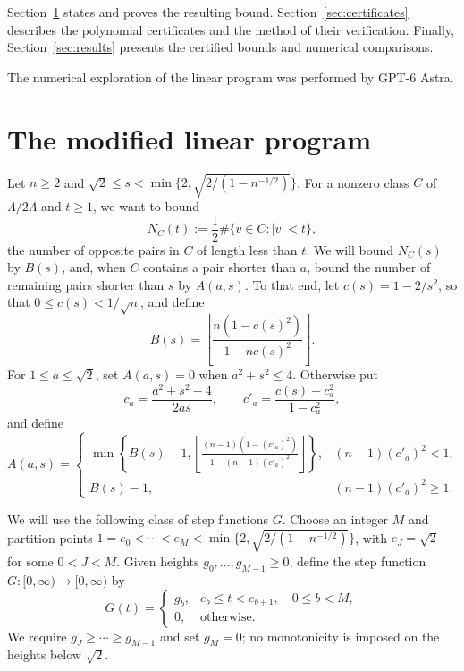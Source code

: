 \documentclass[11pt]{article}
\begin{document}
Section~\ref{sec:class-bound} states and proves the resulting bound.
Section~\ref{sec:certificates} describes the polynomial certificates
and the method of their verification. Finally, Section~\ref{sec:results}
presents the certified bounds and numerical comparisons.

The numerical exploration of the linear program was performed by GPT-$6$ Astra.

\section{The modified linear program}\label{sec:class-bound}



Let $n\ge2$ and $\sqrt2\le s<\min\{2,\sqrt{2/(1-n^{-1/2})}\}$.
For a nonzero class $C$ of $\Lambda/2\Lambda$ and $t\ge1$, we want to bound
\[
 N_C(t):=\frac12\#\{v\in C:|v|<t\},
\]
the number of opposite pairs in $C$ of length less than $t$.
We will bound $N_C(s)$ by $B(s)$, and, when $C$ contains a pair shorter
than $a$, bound the number of remaining pairs shorter than $s$ by $A(a,s)$.
To that end, let $c(s)=1-2/s^2$, so that $0\le c(s)<1/\sqrt n$, and define
\begin{equation}\label{eq:B}
 B(s)=\left\lfloor\frac{n(1-c(s)^2)}{1-nc(s)^2}\right\rfloor.
\end{equation}
For $1\le a\le\sqrt2$, set $A(a,s)=0$
when $a^2+s^2\le4$. Otherwise put
\[
 c_a=\frac{a^2+s^2-4}{2as},\qquad
 c'_a=\frac{c(s)+c_a^2}{1-c_a^2},
\]
and define
\begin{equation}\label{eq:A}
 A(a,s)=\begin{cases}
 \displaystyle\min\left\{B(s)-1,
 \left\lfloor\frac{(n-1)(1-(c'_a)^2)}{1-(n-1)(c'_a)^2}\right\rfloor\right\},
 &(n-1)(c'_a)^2<1,\\
 B(s)-1,&(n-1)(c'_a)^2\ge1.
 \end{cases}
\end{equation}

We will use the following class of step functions $G$. Choose an integer $M$ and partition points
$1=e_0<\cdots<e_M<\min\{2,\sqrt{2/(1-n^{-1/2})}\}$, with $e_J=\sqrt2$ for some $0<J<M$. Given heights $g_0,\ldots,g_{M-1}\ge0$, define
the step function $G:[0,\infty)\to[0,\infty)$ by
\begin{equation}\label{eq:weight}
 G(t)=\begin{cases}
 g_b,&e_b\le t<e_{b+1},\quad 0\le b<M,\\
 0,&\text{otherwise}.
 \end{cases}
\end{equation}
We require $g_J\ge\cdots\ge g_{M-1}$ and set $g_M=0$; no monotonicity
is imposed on the heights below $\sqrt2$. 
\end{document}
